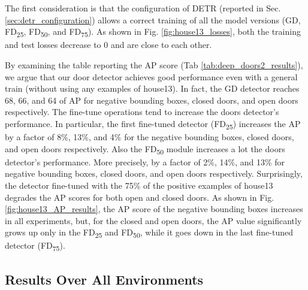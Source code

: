 \newpage

The first consideration is that the configuration of DETR (reported in Sec. \ref{sec:detr_configuration}) allows  a correct training of all the model versions (\textsf{GD}, \textsf{FD\textsubscript{25}}, \textsf{FD\textsubscript{50}}, and \textsf{FD\textsubscript{75}}). As shown in Fig. \ref{fig:house13_losses}, both the training and test losses decrease to 0 and are close to each other. 

By examining the table reporting the AP score (Tab \ref{tab:deep_doors2_results}), we argue that our door detector achieves good performance even with a general train (without using any examples of {house13}). In fact, the \textsf{GD} detector reaches 68, 66, and 64 of AP for negative bounding boxes, closed doors, and open doors respectively. The fine-tune operations tend to increase the doors detector's performance. In particular, the first fine-tuned detector (\textsf{FD\textsubscript{25}}) increases the AP by a factor of 8\%, 13\%, and 4\% for the negative bounding boxes, closed doors, and open doors respectively. Also the \textsf{FD\textsubscript{50}} module increases a lot the doors detector's performance. More precisely, by a factor of 2\%, 14\%, and 13\% for negative bounding boxes, closed doors, and open doors respectively. Surprisingly, the detector fine-tuned with the 75\% of the positive examples of \textsf{house13} degrades the AP scores for both open and closed doors. As shown in Fig. \ref{fig:house13_AP_results}, the AP score of the negative bounding boxes increases in all experiments, but, for the closed and open doors, the AP value significantly grows up only in the \textsf{FD\textsubscript{25}} and \textsf{FD\textsubscript{50}}, while it goes down in the last fine-tuned detector (\textsf{FD\textsubscript{75}}).

\subsection{Results Over All Environments}

